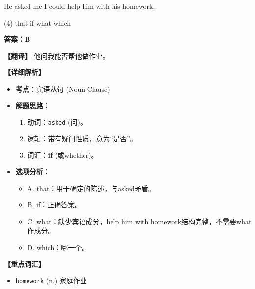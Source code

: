 \documentclass[11pt, a4paper]{article}
\newcommand{\analysis}[4]{
    \begin{solutionbox}
        \textbf{答案：#1}
        
        \textbf{【翻译】} #2
        
        \textbf{【详细解析】}
        #3
        
        \textbf{【重点词汇】}
        #4
    \end{solutionbox}
}
\newcommand{\blank}{\underline{\hspace{1.5cm}}}
\begin{document}
\begin{questions}
    \item He asked me \blank I could help him with his homework.
    \begin{tasks}(4)
        \task that \task if \task what \task which
    \end{tasks}
    \analysis{B}{他问我能否帮他做作业。}{
        \begin{itemize}
            \item \textbf{考点}：宾语从句 (Noun Clause)
            \item \textbf{解题思路}：
                \begin{enumerate}
                    \item 动词：\texttt{asked} (问)。
                    \item 逻辑：带有疑问性质，意为“是否”。
                    \item 词汇：\textbf{if} (或whether)。
                \end{enumerate}
            \item \textbf{选项分析}：
                \begin{itemize}
                    \item A. that：用于确定的陈述，与asked矛盾。
                    \item B. if：正确答案。
                    \item C. what：缺少宾语成分，help him with homework结构完整，不需要what作成分。
                    \item D. which：哪一个。
                \end{itemize}
        \end{itemize}
    }{
        \begin{itemize}
            \item \texttt{homework} (n.) 家庭作业
        \end{itemize}
    }


\end{questions}
\end{document}
